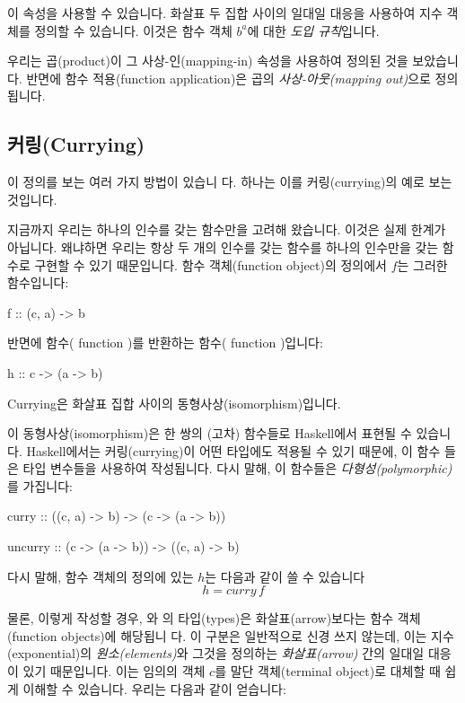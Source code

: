 \documentclass[DaoFP]{subfiles}
\begin{document}
이 속성을 사용할 수 있습니다. 화살표 두 집합 사이의 일대일 대응을 사용하여 지수 객체를 정의할 수 있습니다. 이것은 함수 객체 $b^a$에 대한 \emph{도입 규칙}입니다.

우리는 곱(product)이 그 사상-인(mapping-in) 속성을 사용하여 정의된 것을 보았습니다. 반면에 함수 적용(function application)은 곱의 \emph{사상-아웃(mapping out)}으로 정의됩니다.

\subsection{커링(Currying)}

이 정의를 보는 여러 가지 방법이 있습니
다. 하나는 이를 커링(currying)의 예로 보는 것입니다.

지금까지 우리는 하나의 인수를 갖는 함수만을 고려해 왔습니다. 이것은 실제 한계가 아닙니다. 왜냐하면 우리는 항상 두 개의 인수를 갖는 함수를 하나의 인수만을 갖는 함수로 구현할 수 있기 때문입니다. 함수 객체(function object)의 정의에서 $f$는 그러한 함수입니다:
\begin{haskell}
f :: (c, a) -> b
\end{haskell}
 반면에 함수( function )를 반환하는 함수( function )입니다:
\begin{haskell}
h :: c -> (a -> b)
\end{haskell}
Currying은 화살표 집합 사이의 동형사상(isomorphism)입니다.

이 동형사상(isomorphism)은 한 쌍의 (고차) 함수들로 Haskell에서 표현될 수 있습니 다. Haskell에서는 커링(currying)이 어떤 타입에도 적용될 수 있기 때문에, 이 함수 들은 타입 변수들을 사용하여 작성됩니다. 다시 말해, 이 함수들은 \emph{다형성(polymorphic)}를 가집니다:
\begin{haskell}
curry   :: ((c, a) -> b)   -> (c -> (a -> b))
\end{haskell}

\begin{haskell}
uncurry :: (c -> (a -> b)) -> ((c, a) -> b)
\end{haskell}
다시 말해, 함수 객체의 정의에 있는 $h$는 다음과 같이 쓸 수 있습니다
\[ h = curry\, f \]

물론, 이렇게 작성할 경우, 와 의 타입(types)은 화살표(arrow)보다는 함수 객체(function objects)에 해당됩니 다. 이 구분은 일반적으로 신경 쓰지 않는데, 이는 지수(exponential)의 \emph{원소(elements)}와 그것을 정의하는 \emph{화살표(arrow)} 간의 일대일 대응이 있기 때문입니다. 이는 임의의 객체 $c$를 말단 객체(terminal object)로 대체할 때 쉽게 이해할 수 있습니다. 우리는 다음과 같이 얻습니다:
\end{document}
